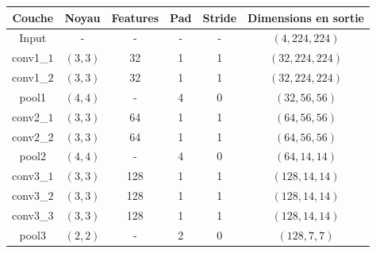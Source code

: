 \documentclass[a4paper, 11pt]{report}
\begin{document}
\begin{table}[H]
	\centering
	\begin{tabular}{|c|c|c|c|c|c|c|c|c|c|c|}
	\hline 
	Couche & \multicolumn{2}{c|}{Noyau} & \multicolumn{2}{c|}{Features} & \multicolumn{2}{c|}{Pad} & \multicolumn{2}{c|}{Stride} & \multicolumn{2}{c|}{Dimensions en sortie}\\ 
	\hline 
	Input & \multicolumn{2}{c|}{-} & \multicolumn{2}{c|}{-} & \multicolumn{2}{c|}{-} & \multicolumn{2}{c|}{-} & \multicolumn{2}{c|}{$(4, 224, 224)$}\\ 
	\hline 
	conv1\_$1$ & \multicolumn{2}{c|}{$(3, 3)$} & \multicolumn{2}{c|}{32} & \multicolumn{2}{c|}{1} & \multicolumn{2}{c|}{1} & \multicolumn{2}{c|}{$(32, 224, 224)$}\\ 
	\hline
	conv1\_$2$ & \multicolumn{2}{c|}{$(3, 3)$} & \multicolumn{2}{c|}{32} & \multicolumn{2}{c|}{1} & \multicolumn{2}{c|}{1} & \multicolumn{2}{c|}{$(32, 224, 224)$}\\ 
	\hline 
	pool1 & \multicolumn{2}{c|}{$(4, 4)$} & \multicolumn{2}{c|}{-} & \multicolumn{2}{c|}{4} & \multicolumn{2}{c|}{0} & \multicolumn{2}{c|}{$(32, 56, 56)$}\\ 
	\hline 
	conv2\_$1$ & \multicolumn{2}{c|}{$(3, 3)$} & \multicolumn{2}{c|}{64} & \multicolumn{2}{c|}{1} & \multicolumn{2}{c|}{1} & \multicolumn{2}{c|}{$(64, 56, 56)$}\\ 
	\hline
	conv2\_$2$ & \multicolumn{2}{c|}{$(3, 3)$} & \multicolumn{2}{c|}{64} & \multicolumn{2}{c|}{1} & \multicolumn{2}{c|}{1} & \multicolumn{2}{c|}{$(64, 56, 56)$}\\ 
	\hline 
	pool2 & \multicolumn{2}{c|}{$(4, 4)$} & \multicolumn{2}{c|}{-} & \multicolumn{2}{c|}{4} & \multicolumn{2}{c|}{0} & \multicolumn{2}{c|}{$(64, 14, 14)$}\\ 
	\hline 
	conv3\_$1$ & \multicolumn{2}{c|}{$(3, 3)$} & \multicolumn{2}{c|}{128} & \multicolumn{2}{c|}{1} & \multicolumn{2}{c|}{1} & \multicolumn{2}{c|}{$(128, 14, 14)$}\\ 
	\hline
	conv3\_$2$ & \multicolumn{2}{c|}{$(3, 3)$} & \multicolumn{2}{c|}{128} & \multicolumn{2}{c|}{1} & \multicolumn{2}{c|}{1} & \multicolumn{2}{c|}{$(128, 14, 14)$}\\ 
	\hline
	conv3\_$3$ & \multicolumn{2}{c|}{$(3, 3)$} & \multicolumn{2}{c|}{128} & \multicolumn{2}{c|}{1} & \multicolumn{2}{c|}{1} & \multicolumn{2}{c|}{$(128, 14, 14)$}\\ 
	\hline 
	pool3 & \multicolumn{2}{c|}{$(2, 2)$} & \multicolumn{2}{c|}{-} & \multicolumn{2}{c|}{2} & \multicolumn{2}{c|}{0} & \multicolumn{2}{c|}{$(128, 7, 7)$}\\ 

\end{tabular}
\end{table}
\end{document}
